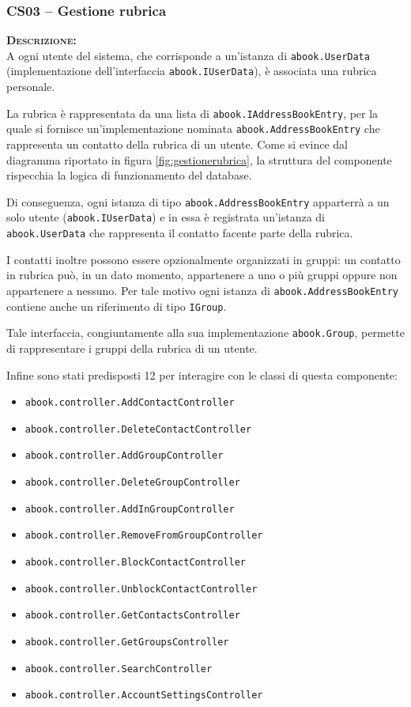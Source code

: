 \subsubsection{CS03 -- Gestione rubrica}\label{sec:cs03}
\begin{description}
	\item{\scshape\bfseries Descrizione:}\\
A ogni utente del sistema, che corrisponde a un'istanza di \texttt{abook.UserData} (implementazione dell'interfaccia \texttt{abook.IUserData}), è associata una rubrica personale. 

La rubrica è rappresentata da una lista di \texttt{abook.IAddressBookEntry}, per la quale si fornisce un'implementazione nominata \texttt{abook.AddressBookEntry} che rappresenta un contatto della rubrica di un utente. Come si evince dal diagramma riportato in figura \ref{fig:gestionerubrica}, la struttura del componente rispecchia la logica di funzionamento del database.

Di conseguenza, ogni istanza di tipo \texttt{abook.AddressBookEntry} apparterrà a un solo utente (\texttt{abook.IUserData}) e in essa è registrata un'istanza di \texttt{abook.UserData} che rappresenta il contatto facente parte della rubrica.

I contatti inoltre possono essere opzionalmente organizzati in gruppi: un contatto in rubrica può, in un dato momento, appartenere a uno o più gruppi oppure non appartenere a nessuno. Per tale motivo ogni istanza di \texttt{abook.AddressBookEntry} contiene anche un riferimento di tipo \texttt{IGroup}.

Tale interfaccia, congiuntamente alla sua implementazione \texttt{abook.Group}, permette di rappresentare i gruppi della rubrica di un utente.

Infine sono stati predisposti 12  per interagire con le classi di questa componente:

\begin{itemize}
	  \item \texttt{abook.controller.AddContactController}
	  \item \texttt{abook.controller.DeleteContactController}
	  \item \texttt{abook.controller.AddGroupController}
	  \item \texttt{abook.controller.DeleteGroupController}
	  \item \texttt{abook.controller.AddInGroupController}
	  \item \texttt{abook.controller.RemoveFromGroupController}
	  \item \texttt{abook.controller.BlockContactController}
	  \item \texttt{abook.controller.UnblockContactController}
	  \item \texttt{abook.controller.GetContactsController}
	  \item \texttt{abook.controller.GetGroupsController}
	  \item \texttt{abook.controller.SearchController}
	  \item \texttt{abook.controller.AccountSettingsController}
\end{itemize}


\end{description}
